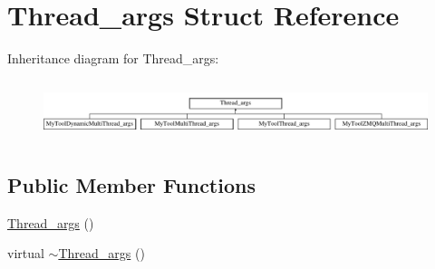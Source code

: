 \hypertarget{structThread__args}{\section{Thread\-\_\-args Struct Reference}
\label{structThread__args}
}
Inheritance diagram for Thread\-\_\-args\-:\begin{figure}[H]
\begin{center}
\leavevmode
\includegraphics[height=1.777778cm]{structThread__args}
\end{center}
\end{figure}
\subsection*{Public Member Functions}
\begin{DoxyCompactItemize}
\item 
\hyperlink{structThread__args_a399b672e0f4f137fe52c141bd8c38eb1}{Thread\-\_\-args} ()
\item 
virtual \hyperlink{structThread__args_ad786e0c55b4e44bc04d9ba3b813bace1}{$\sim$\-Thread\-\_\-args} ()
\end{DoxyCompactItemize}
